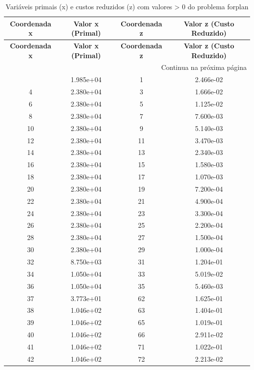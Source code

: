 \documentclass[12pt]{article}
\begin{document}
\begin{longtable}{@{}cccc@{}}
\caption{Variáveis primais (x) e custos reduzidos (z) com valores > 0 do problema forplan} \\
\toprule
\textbf{Coordenada x} & \textbf{Valor x (Primal)} & \textbf{Coordenada z} & \textbf{Valor z (Custo Reduzido)} \\
\midrule
\endfirsthead

\toprule
\textbf{Coordenada x} & \textbf{Valor x (Primal)} & \textbf{Coordenada z} & \textbf{Valor z (Custo Reduzido)} \\
\midrule
\endhead

\midrule \multicolumn{4}{r}{{Continua na próxima página}} \\ \midrule
\endfoot

\bottomrule
\endlastfoot
2 & 1.985e+04 & 1 & 2.466e-02 \\
4 & 2.380e+04 & 3 & 1.666e-02 \\
6 & 2.380e+04 & 5 & 1.125e-02 \\
8 & 2.380e+04 & 7 & 7.600e-03 \\
10 & 2.380e+04 & 9 & 5.140e-03 \\
12 & 2.380e+04 & 11 & 3.470e-03 \\
14 & 2.380e+04 & 13 & 2.340e-03 \\
16 & 2.380e+04 & 15 & 1.580e-03 \\
18 & 2.380e+04 & 17 & 1.070e-03 \\
20 & 2.380e+04 & 19 & 7.200e-04 \\
22 & 2.380e+04 & 21 & 4.900e-04 \\
24 & 2.380e+04 & 23 & 3.300e-04 \\
26 & 2.380e+04 & 25 & 2.200e-04 \\
28 & 2.380e+04 & 27 & 1.500e-04 \\
30 & 2.380e+04 & 29 & 1.000e-04 \\
32 & 8.750e+03 & 31 & 1.204e-01 \\
34 & 1.050e+04 & 33 & 5.019e-02 \\
36 & 1.050e+04 & 35 & 5.460e-03 \\
37 & 3.773e+01 & 62 & 1.625e-01 \\
38 & 1.046e+02 & 63 & 1.404e-01 \\
39 & 1.046e+02 & 65 & 1.019e-01 \\
40 & 1.046e+02 & 66 & 2.911e-02 \\
41 & 1.046e+02 & 71 & 1.022e-01 \\
42 & 1.046e+02 & 72 & 2.213e-02 \\

\end{longtable}
\end{document}
